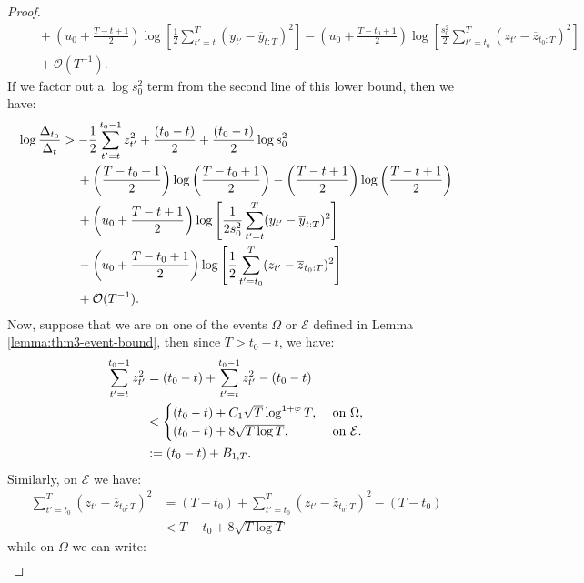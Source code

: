 \begin{proof}
\begin{align*}
    &\quad\: + \left(u_0 + \frac{T - t +1}{2}\right)\log\left[ \frac{1}{2}\sum_{t'=t}^T (y_{t'} - \overline{y}_{t:T})^2 \right] - \left(u_0 + \frac{T - t_0 +1}{2}\right)\log\left[\frac{s_0^2}{2}\sum_{t'=t_0}^T  (z_{t'} - \overline{z}_{t_0:T})^2 \right] \\
    &\quad\: +  \mathcal{O}(T^{-1}).
\end{align*}
If we factor out a $\log s_0^2$ term from the second line of this lower bound, then we have:
\begin{align}
    \log \frac{\Delta_{t_0}}{\Delta_t} &> - \frac{1}{2} \sum_{t' = t}^{t_0 - 1} z_{t'}^2 + \frac{(t_0-t)}{2} + \frac{(t_0-t)}{2}\log s_0^2 \notag \\
    &\quad\: + \left(\frac{T - t_0 + 1}{2}\right) \log\left(\frac{T-t_0+1}{2}\right) - \left(\frac{T - t + 1}{2}\right) \log\left(\frac{T-t+1}{2}\right) \notag\\
    &\quad\: + \left(u_0 + \frac{T - t +1}{2}\right)\log\left[ \frac{1}{2s_0^2}\sum_{t'=t}^T (y_{t'} - \overline{y}_{t:T})^2 \right] \notag\\
    &\quad\: - \left(u_0 + \frac{T - t_0 +1}{2}\right)\log\left[\frac{1}{2}\sum_{t'=t_0}^T  (z_{t'} - \overline{z}_{t_0:T})^2 \right] \notag\\
    &\quad\: +  \mathcal{O}(T^{-1}). \label{eq:thm3-cs2-bd1}
\end{align}
Now, suppose that we are on one of the events $\Omega$ or $\mathcal{E}$ defined in Lemma \ref{lemma:thm3-event-bound}, then since $T > t_0 - t$, we have:
\begin{align}
    \sum_{t' = t}^{t_0 - 1} z^2_{t'} &= (t_0 - t) + \sum_{t' = t}^{t_0 - 1} z^2_{t'} - (t_0 - t)\notag \\
    &< 
    \begin{cases}
        (t_0 - t) + C_1 \sqrt{T}\log^{1+\varphi} T, & \text{ on } \Omega, \\ 
        (t_0 - t) + 8 \sqrt{T\log T}, &\text{ on } \mathcal{E}.
    \end{cases} \notag \\
    &:=(t_0 - t) + B_{1,T}. \label{eq:thm3-cs2-bd2}
\end{align}
Similarly, on $\mathcal{E}$ we have:
\begin{align*}
    \sum_{t'=t_0}^T (z_{t'} - \overline{z}_{t_0:T})^2 &= (T-t_0) + \sum_{t'=t_0}^T (z_{t'} - \overline{z}_{t_0:T})^2 - (T-t_0) \\
    &< T-t_0 + 8 \sqrt{T \log T}  
\end{align*}
while on $\Omega$ we can write:
\begin{align*}

\end{align*}
\end{proof}
